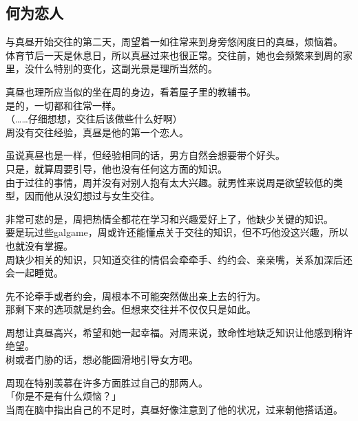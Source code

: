\subsection{何为恋人}

与真昼开始交往的第二天，周望着一如往常来到身旁悠闲度日的真昼，烦恼着。\\

体育节后一天是休息日，所以真昼过来也很正常。交往前，她也会频繁来到周的家里，没什么特别的变化，这副光景是理所当然的。

真昼也理所应当似的坐在周的身边，看着屋子里的教辅书。\\

是的，一切都和往常一样。\\

（……仔细想想，交往后该做些什么好啊）\\

周没有交往经验，真昼是他的第一个恋人。

虽说真昼也是一样，但经验相同的话，男方自然会想要带个好头。\\

只是，就算周要引导，他也没有任何这方面的知识。\\

由于过往的事情，周并没有对别人抱有太大兴趣。就男性来说周是欲望较低的类型，因而他从没幻想过与女生交往。

非常可悲的是，周把热情全都花在学习和兴趣爱好上了，他缺少关键的知识。\\

要是玩过些galgame，周或许还能懂点关于交往的知识，但不巧他没这兴趣，所以也就没有掌握。\\

周缺少相关的知识，只知道交往的情侣会牵牵手、约约会、亲亲嘴，关系加深后还会一起睡觉。

先不论牵手或者约会，周根本不可能突然做出亲上去的行为。\\

那剩下来的选项就是约会。但想来交往并不仅仅只是如此。

周想让真昼高兴，希望和她一起幸福。对周来说，致命性地缺乏知识让他感到稍许绝望。\\

树或者门胁的话，想必能圆滑地引导女方吧。

周现在特别羡慕在许多方面胜过自己的那两人。\\

「你是不是有什么烦恼？」\\

当周在脑中指出自己的不足时，真昼好像注意到了他的状况，过来朝他搭话道。\\

